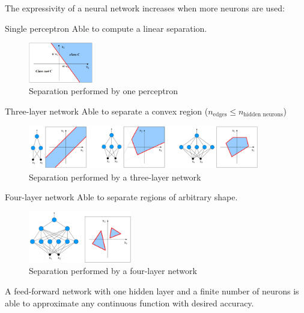 The expressivity of a neural network increases when more neurons are used:
\begin{descriptionlist}
    \item[Single perceptron] 
        Able to compute a linear separation.
        \begin{figure}[h]
            \centering
            \includegraphics[width=0.25\textwidth]{img/1perceptron.png}
            \caption{Separation performed by one perceptron}
        \end{figure}
    \item[Three-layer network] 
        Able to separate a convex region ($n_\text{edges} \leq n_\text{hidden neurons}$)
        \begin{figure}[h]
            \centering
            \includegraphics[width=0.90\textwidth]{img/3layer.png}
            \caption{Separation performed by a three-layer network}
        \end{figure}
    \item[Four-layer network] 
        Able to separate regions of arbitrary shape.
        \begin{figure}[h]
            \centering
            \includegraphics[width=0.40\textwidth]{img/4layer.png}
            \caption{Separation performed by a four-layer network}
        \end{figure}
\end{descriptionlist}

\begin{theorem} 
    A feed-forward network with one hidden layer and a finite number of neurons is
    able to approximate any continuous function with desired accuracy.
\end{theorem}

